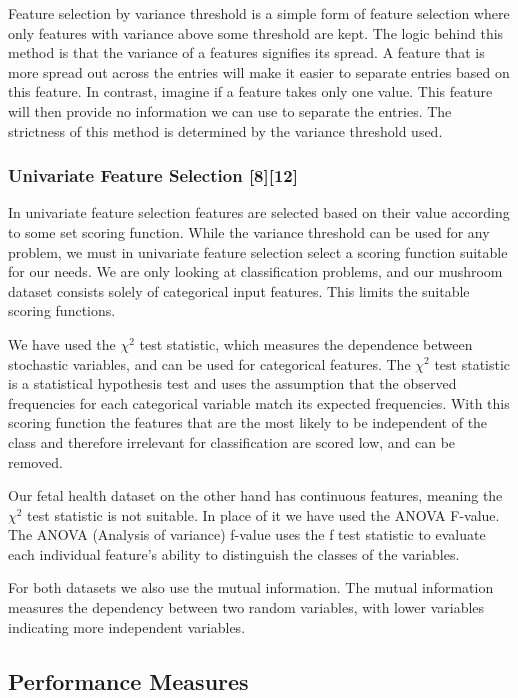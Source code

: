 \documentclass[11pt]{article}
\begin{document}
Feature selection by variance threshold is a simple form of feature selection where only features with variance above some threshold are kept. The logic behind this method is that the variance of a features signifies its spread. A feature that is more spread out across the entries will make it easier to separate entries based on this feature. In contrast, imagine if a feature takes only one value. This feature will then provide no information we can use to separate the entries. The strictness of this method is determined by the variance threshold used.


\hypertarget{univariate-feature-selection}{%
\subsubsection*{Univariate Feature Selection
{[}8{]}[12]}\label{univariate-feature-selection}}

In univariate feature selection features are selected based on their value according to some set scoring function. While the variance threshold can be used for any problem, we must in univariate feature selection select a scoring function suitable for our needs. We are only looking at classification problems, and our mushroom dataset consists solely of categorical input features. This limits the suitable scoring functions. 

We have used the \(\chi^2\) test statistic, which measures the dependence
between stochastic variables, and can be used for categorical features. The \(\chi^2\) test statistic is a statistical hypothesis test and uses the assumption that the observed frequencies for each categorical variable
match its expected frequencies. With this scoring function the features that are the most likely to be independent of the class and therefore irrelevant for classification are scored low, and can be removed. 

Our fetal health dataset on the other hand has continuous features, meaning the \(\chi^2\) test statistic is not suitable. In place of it we have used the ANOVA F-value. The ANOVA (Analysis of variance) f-value uses the f test statistic to evaluate each individual feature's ability to distinguish the classes of the variables. 

For both datasets we also use the mutual information. The mutual information measures the dependency between two random variables, with lower variables indicating more independent variables.


    \hypertarget{performance-measures}{%
\subsection{Performance Measures}\label{performance-measures}}
\end{document}
